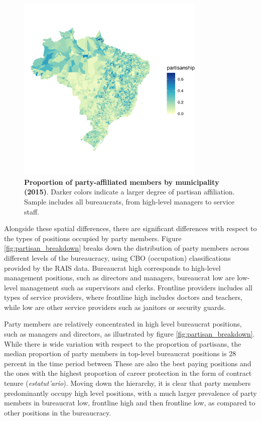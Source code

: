 \begin{figure}[H]
    \centering
    \includegraphics[width = 9cm, height = 9cm]{chapters/chapter_3/figures/maps/pooled.png}
    \caption{\textbf{Proportion of party-affiliated members by municipality (2015)}. Darker colors indicate a larger degree of partisan affiliation. Sample includes all bureaucrats, from high-level managers to service staff.}
    \label{fig:map_pooled}
\end{figure}

Alongside these spatial differences, there are significant differences with respect to the types of positions occupied by party members. Figure \ref{fig:partisan_breakdown} breaks down the distribution of party members across different levels of the bureaucracy, using CBO (occupation) classifications provided by the RAIS data. Bureaucrat high corresponds to high-level management positions, such as directors and managers, bureaucrat low are low-level management such as supervisors and clerks. Frontline providers includes all types of service providers, where frontline high includes doctors and teachers, while low are other service providers such as janitors or security guards. 

Party members are relatively concentrated in high level bureaucrat positions, such as managers and directors, as illustrated by figure \ref{fig:partisan_breakdown}. While there is wide variation with respect to the proportion of partisans, the median proportion of party members in top-level bureaucrat positions is 28 percent in the time period between  These are also the best paying positions and the ones with the highest proportion of career protection in the form of contract tenure (\emph{estatut'{a}rio}). Moving down the hierarchy, it is clear that party members predominantly occupy high level positions, with a much larger prevalence of party members in bureaucrat low, frontline high and then frontline low, as compared to other positions in the bureaucracy.

